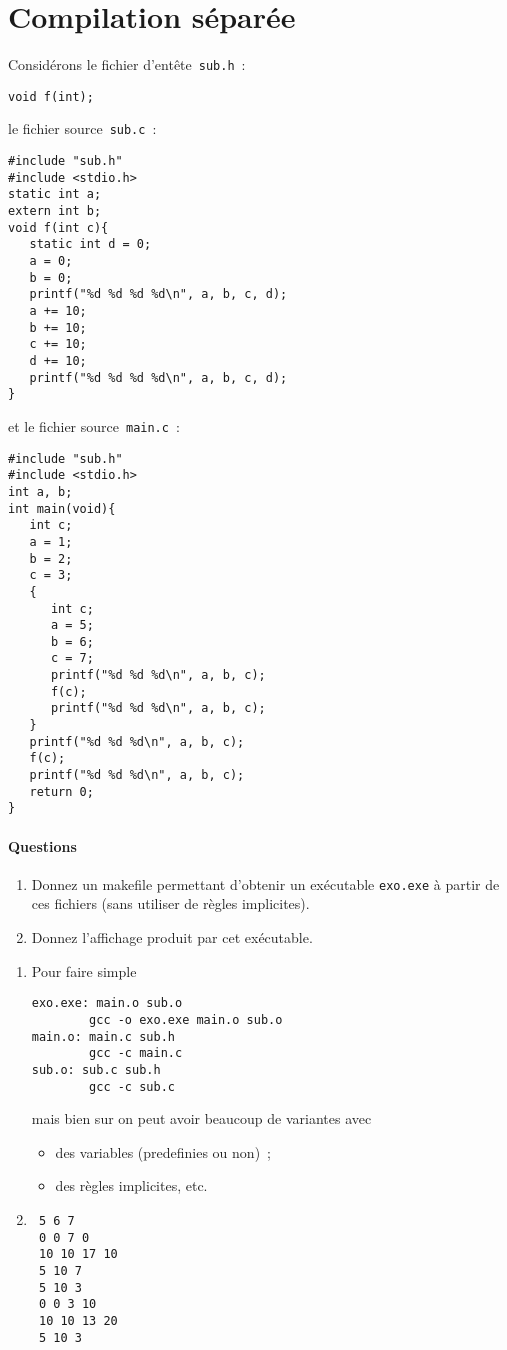 \section{Compilation s\'epar\'ee}
Consid\'erons le fichier d'ent\^ete~\verb+sub.h+~:
\begin{verbatim}
void f(int);
\end{verbatim}
le fichier source~\verb+sub.c+~:
\begin{verbatim}
#include "sub.h"
#include <stdio.h>
static int a;
extern int b;
void f(int c){  
   static int d = 0;
   a = 0;
   b = 0;
   printf("%d %d %d %d\n", a, b, c, d);
   a += 10;
   b += 10;
   c += 10;
   d += 10;
   printf("%d %d %d %d\n", a, b, c, d);
}
\end{verbatim}
et le fichier source~\verb+main.c+~:
\begin{verbatim}
#include "sub.h"
#include <stdio.h>
int a, b;
int main(void){
   int c;
   a = 1;
   b = 2;
   c = 3;
   {
      int c;
      a = 5;
      b = 6;
      c = 7;
      printf("%d %d %d\n", a, b, c);
      f(c);
      printf("%d %d %d\n", a, b, c);
   }
   printf("%d %d %d\n", a, b, c);
   f(c);
   printf("%d %d %d\n", a, b, c);
   return 0;
}
\end{verbatim}
\paragraph{Questions}
\begin{enumerate}
\item Donnez un makefile permettant d'obtenir un ex\'ecutable \verb+exo.exe+ 
\`a partir de ces fichiers (sans utiliser de r\`egles implicites).
\item Donnez l'affichage produit par cet ex\'ecutable.
\end{enumerate}
\ifcorrection
\begin{enumerate}
\item Pour faire simple
\begin{verbatim}
exo.exe: main.o sub.o
        gcc -o exo.exe main.o sub.o
main.o: main.c sub.h
        gcc -c main.c
sub.o: sub.c sub.h
        gcc -c sub.c
\end{verbatim}
mais bien sur on peut avoir beaucoup de variantes avec
\begin{itemize}
\item des variables (predefinies ou non)~;
\item des r\`egles implicites, etc.
\end{itemize}
\item
\begin{verbatim}
 5 6 7
 0 0 7 0
 10 10 17 10
 5 10 7
 5 10 3
 0 0 3 10
 10 10 13 20
 5 10 3
\end{verbatim}
\end{enumerate}
\fi
